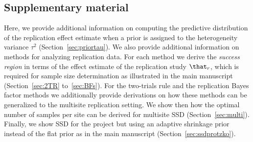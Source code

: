\begin{subappendices}
\section{Supplementary material}

Here, we provide additional information on computing the predictive distribution
of the replication effect estimate when a prior is assigned to the heterogeneity
variance $\tau^{2}$ (Section~\ref{sec:priortau}). We also provide additional
information on methods for analyzing replication data. For each method we derive
the \emph{success region} in terms of the effect estimate of the replication
study $\that_{r}$, which is required for sample size determination as
illustrated in the main manuscript (Section~\ref{sec:2TR} to~\ref{sec:BFs}). For
the two-trials rule and the replication Bayes factor methods we additionally
provide derivations on how these methods can be generalized to the multisite
replication setting. We show then how the optimal number of samples per site can
be derived for multisite SSD (Section~\ref{sec:multi}). Finally, we show SSD for
the \citet{Protzko2020} project but using an adaptive shrinkage prior instead of
the flat prior as in the main manuscript (Section~\ref{sec:ssdprotzko}).


\end{subappendices}

